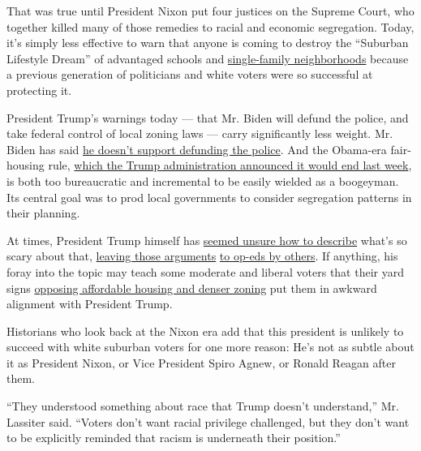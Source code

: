 That was true until President Nixon put four justices on the Supreme
Court, who together killed many of those remedies to racial and economic
segregation. Today, it's simply less effective to warn that anyone is
coming to destroy the ``Suburban Lifestyle Dream'' of advantaged schools
and
\href{https://www.nytimes.com/interactive/2019/06/18/upshot/cities-across-america-question-single-family-zoning.html}{single-family
neighborhoods} because a previous generation of politicians and white
voters were so successful at protecting it.

President Trump's warnings today --- that Mr. Biden will defund the
police, and take federal control of local zoning laws --- carry
significantly less weight. Mr. Biden has said
\href{https://www.npr.org/sections/live-updates-protests-for-racial-justice/2020/06/08/872376757/biden-opposes-defunding-police-campaign-says}{he
doesn't support defunding the police}. And the Obama-era fair-housing
rule,
\href{https://www.nytimes.com/2020/07/23/us/politics/trump-housing-discrimination-suburbs.html}{which
the Trump administration announced it would end last week}, is both too
bureaucratic and incremental to be easily wielded as a boogeyman. Its
central goal was to prod local governments to consider segregation
patterns in their planning.

At times, President Trump himself has
\href{https://twitter.com/realDonaldTrump/status/1278136326647406593}{seemed
unsure how to describe} what's so scary about that,
\href{https://twitter.com/realDonaldTrump/status/1286372175117791236}{leaving
those arguments}
\href{https://www.nationalreview.com/corner/biden-and-dems-are-set-to-abolish-the-suburbs/}{to
op-eds by others}. If anything, his foray into the topic may teach some
moderate and liberal voters that their yard signs
\href{https://www.nytimes.com/2018/08/21/upshot/home-ownership-nimby-bipartisan.html}{opposing
affordable housing and denser zoning} put them in awkward alignment with
President Trump.

Historians who look back at the Nixon era add that this president is
unlikely to succeed with white suburban voters for one more reason: He's
not as subtle about it as President Nixon, or Vice President Spiro
Agnew, or Ronald Reagan after them.

``They understood something about race that Trump doesn't understand,''
Mr. Lassiter said. ``Voters don't want racial privilege challenged, but
they don't want to be explicitly reminded that racism is underneath
their position.''

